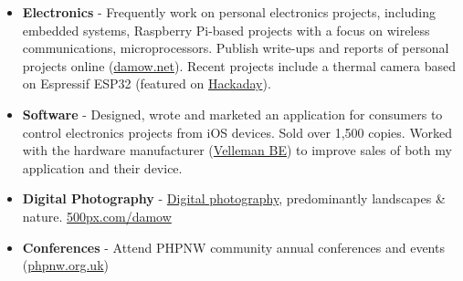 \begin{itemize}

    \item \textbf{Electronics} - Frequently work on personal electronics projects, including embedded systems, Raspberry Pi-based projects with a focus on wireless communications, microprocessors. Publish write-ups and reports of personal projects online (\href{https://damow.net}{damow.net}). Recent projects include a thermal camera based on Espressif ESP32 (featured on \href{https://hackaday.com/2017/12/27/dead-ebay-thermal-camera-is-an-organ-donor/}{Hackaday}).

    \item \textbf{Software} - Designed, wrote and marketed an application for consumers to control electronics projects from iOS devices. Sold over 1,500 copies. Worked with the hardware manufacturer (\href{http://www.velleman.eu/}{Velleman BE}) to improve sales of both my application and their device.

    \item \textbf{Digital Photography} - \href{https://500px.com/damow}{Digital photography}, predominantly landscapes \& nature. \href{https://500px.com/damow}{500px.com/damow}

    \item \textbf{Conferences} - Attend PHPNW community annual conferences and events (\href{http://www.phpnw.org.uk}{phpnw.org.uk})

\end{itemize}
